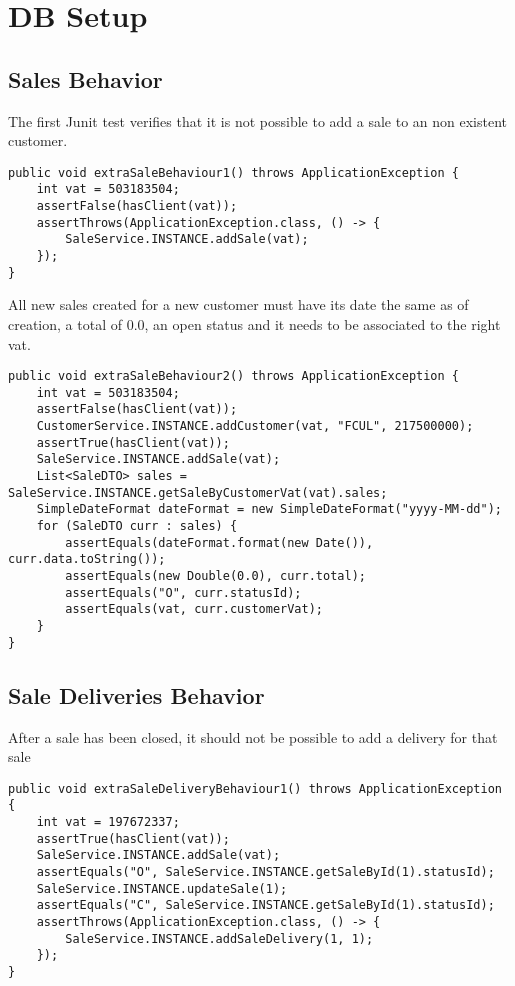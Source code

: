 \documentclass[12pt]{article}
\begin{document}
\section{DB Setup}
\subsection{Sales Behavior}
The first Junit test verifies that it is not possible to add a sale to an non existent customer. 
\begin{lstlisting}
public void extraSaleBehaviour1() throws ApplicationException {
	int vat = 503183504;
	assertFalse(hasClient(vat));
	assertThrows(ApplicationException.class, () -> {
		SaleService.INSTANCE.addSale(vat);
	});	
}	
\end{lstlisting}

All new sales created for a new customer must have its date the same as of creation, a total of 0.0, an open status and it needs to be associated to the right vat.
\begin{lstlisting}
public void extraSaleBehaviour2() throws ApplicationException {
	int vat = 503183504;
	assertFalse(hasClient(vat));
	CustomerService.INSTANCE.addCustomer(vat, "FCUL", 217500000);
	assertTrue(hasClient(vat));
	SaleService.INSTANCE.addSale(vat);
	List<SaleDTO> sales = SaleService.INSTANCE.getSaleByCustomerVat(vat).sales;
	SimpleDateFormat dateFormat = new SimpleDateFormat("yyyy-MM-dd");
	for (SaleDTO curr : sales) {
		assertEquals(dateFormat.format(new Date()), curr.data.toString());
		assertEquals(new Double(0.0), curr.total);
		assertEquals("O", curr.statusId);
		assertEquals(vat, curr.customerVat);
	}		
}
\end{lstlisting}
\subsection{Sale Deliveries Behavior}
After a sale has been closed, it should not be possible to add a delivery for that sale 
\begin{lstlisting}
public void extraSaleDeliveryBehaviour1() throws ApplicationException {
	int vat = 197672337;
	assertTrue(hasClient(vat));
	SaleService.INSTANCE.addSale(vat);
	assertEquals("O", SaleService.INSTANCE.getSaleById(1).statusId);
	SaleService.INSTANCE.updateSale(1);
	assertEquals("C", SaleService.INSTANCE.getSaleById(1).statusId);
	assertThrows(ApplicationException.class, () -> {
		SaleService.INSTANCE.addSaleDelivery(1, 1);
	});		
}
\end{lstlisting}
\end{document}
